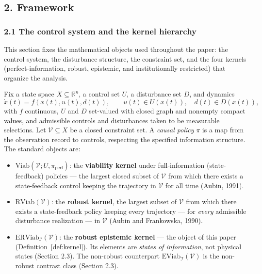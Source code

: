 \documentclass[11pt]{article}
\theoremstyle{definition}
\providecommand{\tightlist}{\setlength{\itemsep}{0pt}\setlength{\parskip}{0pt}}
\begin{document}
\subsection{2. Framework}\label{framework}

\subsubsection{2.1 The control system and the kernel
hierarchy}\label{the-control-system-and-the-kernel-hierarchy}

This section fixes the mathematical objects used throughout the paper:
the control system, the disturbance structure, the constraint set, and
the four kernels (perfect-information, robust, epistemic, and
institutionally restricted) that organize the analysis.

Fix a state space \(X \subseteq \mathbb{R}^n\), a control set \(U\), a
disturbance set \(D\), and dynamics
\[\dot x(t) = f(x(t), u(t), d(t)), \qquad u(t) \in U(x(t)), \quad d(t) \in D(x(t)),\]
with \(f\) continuous, \(U\) and \(D\) set-valued with closed graph and
nonempty compact values, and admissible controls and disturbances taken
to be measurable selections. Let \(\mathcal{V} \subseteq X\) be a closed
constraint set. A \emph{causal policy} \(\pi\) is a map from the
observation record to controls, respecting the specified information structure. The standard objects are:

\begin{itemize}
\tightlist
\item
  \(\mathrm{Viab}(\mathcal{V}; U, \pi_{\mathrm{perf}})\): the
  \textbf{viability kernel} under full-information (state-feedback)
  policies --- the largest closed subset of \(\mathcal{V}\) from which
  there exists a state-feedback control keeping the trajectory in
  \(\mathcal{V}\) for all time (Aubin, 1991).
\item
  \(\mathrm{RViab}(\mathcal{V})\): the \textbf{robust kernel}, the
  largest subset of \(\mathcal{V}\) from which there exists a
  state-feedback policy keeping every trajectory --- for \emph{every}
  admissible disturbance realization --- in \(\mathcal{V}\) (Aubin and
  Frankowska, 1990).
\item
  \(\mathrm{ERViab}_{\mathcal{I}}(\mathcal{V})\): the \textbf{robust
  epistemic kernel} --- the object of this paper (Definition~\ref{def:kernel}). Its
  elements are \emph{states of information}, not physical states
  (Section 2.3). The non-robust counterpart
  \(\mathrm{EViab}_{\mathcal{I}}(\mathcal{V})\) is the non-robust contrast class (Section 2.3).
\end{itemize}
\end{document}
